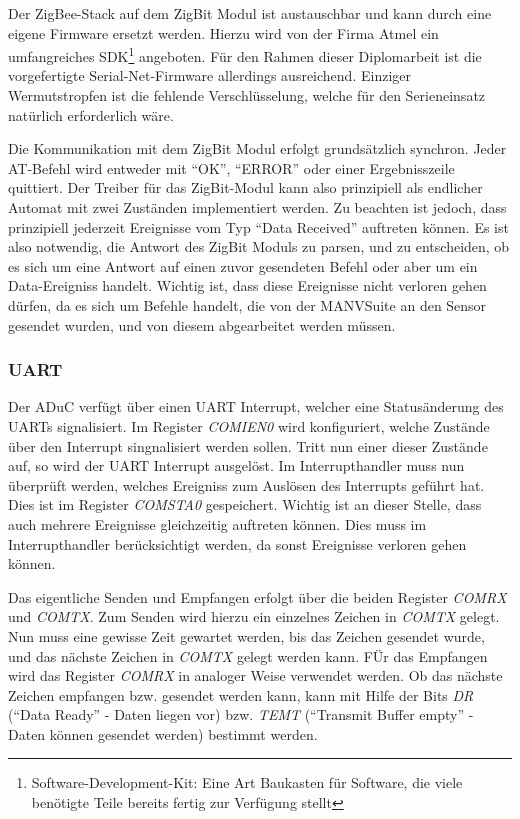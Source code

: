 Der ZigBee-Stack auf dem ZigBit Modul ist austauschbar und kann durch eine eigene Firmware ersetzt werden.
Hierzu wird von der Firma Atmel ein umfangreiches SDK\footnote{Software-Development-Kit: Eine Art Baukasten für
Software, die viele benötigte Teile bereits fertig zur Verfügung stellt} angeboten. Für den Rahmen dieser Diplomarbeit
ist die vorgefertigte Serial-Net-Firmware allerdings ausreichend. Einziger Wermutstropfen ist die fehlende
Verschlüsselung, welche für den Serieneinsatz natürlich erforderlich wäre.

Die Kommunikation mit dem ZigBit Modul erfolgt grundsätzlich synchron. Jeder AT-Befehl wird entweder mit 
"`OK"', "`ERROR"' oder einer Ergebnisszeile quittiert. Der Treiber für das ZigBit-Modul kann also prinzipiell
als endlicher Automat mit zwei Zuständen implementiert werden. Zu beachten ist jedoch, dass prinzipiell
jederzeit Ereignisse vom Typ "`Data Received"' auftreten können. Es ist also notwendig, die Antwort des 
ZigBit Moduls zu parsen, und zu entscheiden, ob es sich um eine Antwort auf einen zuvor gesendeten Befehl
oder aber um ein Data-Ereigniss handelt. Wichtig ist, dass diese Ereignisse nicht verloren gehen dürfen,
da es sich um Befehle handelt, die von der MANVSuite an den Sensor gesendet wurden, und von diesem 
abgearbeitet werden müssen. 


\subsubsection{UART}
Der ADuC verfügt über einen UART Interrupt, welcher eine Statusänderung des UARTs signalisiert. Im Register 
\textsl{COMIEN0} wird konfiguriert, welche Zustände über den Interrupt singnalisiert werden sollen. Tritt
nun einer dieser Zustände auf, so wird der UART Interrupt ausgelöst. Im Interrupthandler muss nun überprüft
werden, welches Ereigniss zum Auslösen des Interrupts geführt hat. Dies ist im Register \textsl{COMSTA0} 
gespeichert. Wichtig ist an dieser Stelle, dass auch mehrere Ereignisse gleichzeitig auftreten können. 
Dies muss im Interrupthandler berücksichtigt werden, da sonst Ereignisse verloren gehen können.

Das eigentliche Senden und Empfangen erfolgt über die beiden Register \textsl{COMRX} und \textsl{COMTX}.
Zum Senden wird hierzu ein einzelnes Zeichen in \textsl{COMTX} gelegt. Nun muss eine gewisse Zeit gewartet
werden, bis das Zeichen gesendet wurde, und das nächste Zeichen in \textsl{COMTX} gelegt werden kann.
FÜr das Empfangen wird das Register \textsl{COMRX} in analoger Weise verwendet werden. Ob das nächste
Zeichen empfangen bzw. gesendet werden kann, kann mit Hilfe der Bits \textsl{DR} ("`Data Ready"' - Daten liegen vor)
bzw. \textsl{TEMT} ("`Transmit Buffer empty"' - Daten können gesendet werden) bestimmt werden.

